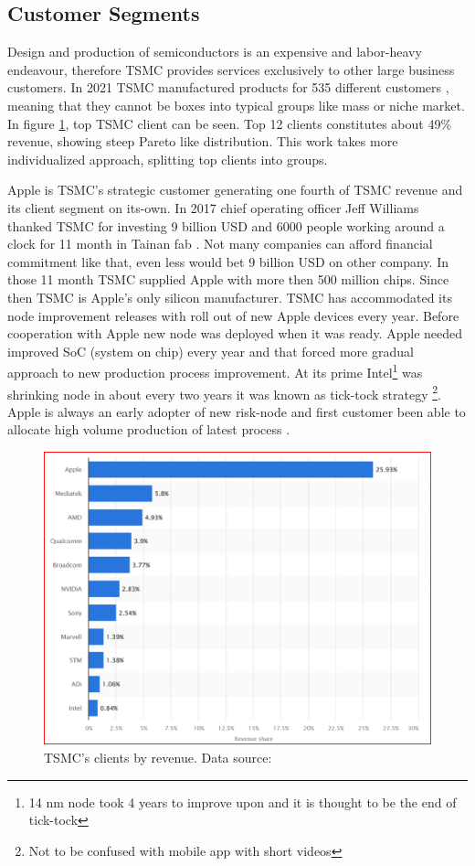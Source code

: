 \documentclass[a4paper,12pt]{article}
\begin{document}
\subsection{Customer Segments}
Design and production of semiconductors is an expensive and labor-heavy endeavour, therefore TSMC provides services exclusively to other large business customers. 
In 2021 TSMC manufactured  products for 535 different customers \cite{TSMCAnnualReport}, meaning that they cannot be boxes into typical groups like mass or niche market. 
In figure \ref{img:net-revenue-by-client}, top TSMC client can be seen. 
Top 12 clients constitutes about 49\%  revenue, showing steep Pareto like distribution.
This work takes more individualized approach, splitting top clients into groups. 

Apple is TSMC's strategic customer generating one fourth of TSMC revenue and its client segment on its-own.
In 2017 chief operating officer Jeff Williams thanked TSMC for investing 9 billion USD and 6000 people working around a clock for 11 month in Tainan fab \cite{AppleOnTSMCInvestment}.
Not many companies can afford financial commitment like that, even less would bet 9 billion USD on other company.
In those 11 month TSMC supplied Apple with more then 500 million chips. 
Since then TSMC is Apple's only silicon manufacturer.
TSMC has accommodated its node improvement releases with roll out of new Apple devices every year.
Before cooperation with Apple new node was deployed when it was ready.
Apple needed improved SoC (system on chip) every year and that forced more gradual approach to new production process improvement. 
At its prime Intel\footnote{14 nm node took 4 years to improve upon and it is thought to be the end of tick-tock} was shrinking node in about every two years it was known as tick-tock strategy \footnote{Not to be confused with mobile app with short videos}.
Apple is always an early adopter of new risk-node and first customer been able to allocate high volume production of latest process \cite{AppleBookAll5nm}. 


\begin{figure}
    \includegraphics[width=0.9\linewidth]{TSMC_revenue_share.png}
    \caption{TSMC's clients by revenue. Data source: \cite{TSCMClientsByRevenue}}
    \label{img:net-revenue-by-client}
\end{figure}
\end{document}
